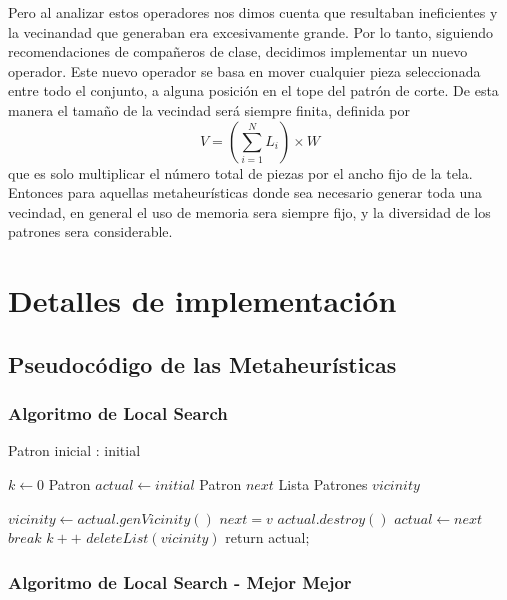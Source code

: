 \documentclass[letterpaper,11pt]{article}
\begin{document}
Pero al analizar estos operadores nos dimos cuenta que resultaban ineficientes y la vecinandad que generaban era excesivamente grande. Por lo tanto, siguiendo recomendaciones
de compa\~neros de clase, decidimos implementar un nuevo operador. Este nuevo operador se basa en mover cualquier pieza seleccionada entre todo el conjunto, a alguna posici\'on
en el tope del patr\'on de corte. De esta manera el tama\~no de la vecindad ser\'a siempre finita, definida por $$ V =  (\sum_{i = 1}^{N} L_i) \times W $$ que es solo multiplicar
el n\'umero total de piezas por el ancho fijo de la tela. Entonces para aquellas metaheur\'isticas donde sea necesario generar toda una vecindad, en general el uso de memoria
sera siempre fijo, y la diversidad de los patrones sera considerable.

\newpage

\section{Detalles de implementaci\'on}

\subsection{Pseudoc\'odigo de las Metaheur\'isticas}

\subsubsection{Algoritmo de Local Search}

\begin{algorithmic}

\REQUIRE Patron inicial : initial

\STATE $k \gets 0$
\STATE  Patron $actual \gets initial$
\STATE  Patron $next$
\STATE  Lista Patrones $vicinity$

	\STATE $ vicinity \gets actual.genVicinity() $
		\STATE $next = v$
        	\STATE $actual.destroy() $
        	\STATE $ actual \gets next$
        	\STATE $break$
        \ENDIF
    \ENDWHILE
    \STATE $k++$
    \STATE $deleteList(vicinity)$
\ENDWHILE
\RETURN  return actual;

\end{algorithmic}

\subsubsection{Algoritmo de Local Search - Mejor Mejor}
\end{document}
